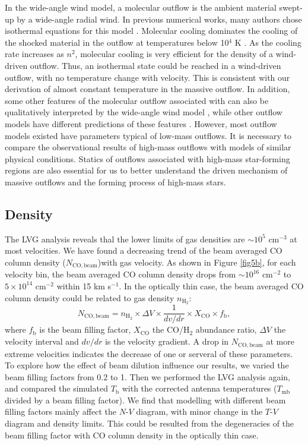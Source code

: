 In the wide-angle wind model, a molecular outflow is the ambient material swept-up by a wide-angle radial wind. In previous numerical works, many authors chose isothermal equations for this model \citep{1996ApJ...472..211L,2001ApJ...557..429L}. Molecular cooling dominates the cooling of the shocked material in the outflow at temperatures below 10$^4$ K \citep{1997IAUS..182..181H}. As the cooling rate increases as $n^2$, molecular cooling is very efficient for the density of a wind-driven outflow. Thus, an isothermal state could be reached in a wind-driven outflow, with no temperature change with velocity. This is consistent with our derivation of almost constant temperature in the massive  outflow. In addition, some other features of the molecular outflow associated with  can also be qualitatively interpreted by the wide-angle wind model \citep{2009ApJ...696...66Q}, while other outflow models have different predictions of these features \citep{2007prpl.conf..245A}. However, most outflow models existed have parameters typical of low-mass outflows. It is necessary to compare the observational results of high-mass outflows with models of similar physical conditions. Statics of outflows associated with high-mass star-forming regions are also essential for us to better understand the driven mechanism of massive outflows and the forming process of high-mass stars.

\subsection{Density}

The LVG analysis reveals thal the lower limits of gas densities are $\sim 10^5$ cm$^{-3}$ at most velocities. We have found a decreasing trend of the beam averaged CO column density ($N_{\mathrm{CO,beam}}$)with gas velocity. As shown in Figure \ref{fig5b}, for each velocity bin, the beam averaged CO column density drops from $\sim 10^{16} $ cm$^{-2}$ to $5 \times 10^{14}$ cm$^{-2}$ within 15 km s$^{-1}$. In the optically thin case, the beam averaged CO column density could be related to gas density $n_{\mathrm{H}_2}$: 
\begin{equation}
N_{\mathrm{CO,beam}} = n_{\mathrm{H}_2} \times \Delta V \times \frac{1}{dv/dr} \times X_{\mathrm{CO}} \times f_{\mathrm{b}}, 
\end{equation}
where $f_{\mathrm{b}}$ is the beam filling factor, $X_{\mathrm{CO}}$ the CO/H$_2$ abundance ratio, $\Delta V$ the velocity interval and $dv/dr$ is the velocity gradient. A drop in $N_{\mathrm{CO,beam}}$ at more extreme velocities indicates the decrease of one or serveral of these parameters. 
To explore how the effect of beam dilution influence our results, we varied the beam filling factors from 0.2 to 1. Then we performed the LVG analysis again, and compared the simulated $T_\mathrm{b}$ with the corrected antenna temperatures ($T_{\mathrm{mb}}$ divided by a beam filling factor). We find that modelling with different beam filling factors mainly affect the $N$-$V$ diagram, with minor change in the $T$-$V$ diagram and density limits. This could be resulted from the degeneracies of the beam filling factor with CO column density in the optically thin case. 

